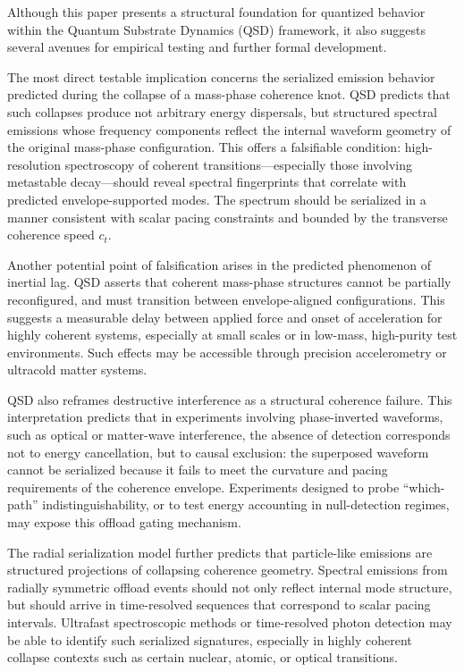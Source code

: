 \documentclass[entropy,article,submit,pdftex,moreauthors]{Definitions/mdpi}
\begin{document}
Although this paper presents a structural foundation for quantized behavior within the Quantum Substrate Dynamics (QSD) framework, it also suggests several avenues for empirical testing and further formal development.

The most direct testable implication concerns the serialized emission behavior predicted during the collapse of a mass-phase coherence knot. QSD predicts that such collapses produce not arbitrary energy dispersals, but structured spectral emissions whose frequency components reflect the internal waveform geometry of the original mass-phase configuration. This offers a falsifiable condition: high-resolution spectroscopy of coherent transitions—especially those involving metastable decay—should reveal spectral fingerprints that correlate with predicted envelope-supported modes. The spectrum should be serialized in a manner consistent with scalar pacing constraints and bounded by the transverse coherence speed \( c_t \).

Another potential point of falsification arises in the predicted phenomenon of inertial lag. QSD asserts that coherent mass-phase structures cannot be partially reconfigured, and must transition between envelope-aligned configurations. This suggests a measurable delay between applied force and onset of acceleration for highly coherent systems, especially at small scales or in low-mass, high-purity test environments. Such effects may be accessible through precision accelerometry or ultracold matter systems.

QSD also reframes destructive interference as a structural coherence failure. This interpretation predicts that in experiments involving phase-inverted waveforms, such as optical or matter-wave interference, the absence of detection corresponds not to energy cancellation, but to causal exclusion: the superposed waveform cannot be serialized because it fails to meet the curvature and pacing requirements of the coherence envelope. Experiments designed to probe “which-path” indistinguishability, or to test energy accounting in null-detection regimes, may expose this offload gating mechanism.

The radial serialization model further predicts that particle-like emissions are structured projections of collapsing coherence geometry. Spectral emissions from radially symmetric offload events should not only reflect internal mode structure, but should arrive in time-resolved sequences that correspond to scalar pacing intervals. Ultrafast spectroscopic methods or time-resolved photon detection may be able to identify such serialized signatures, especially in highly coherent collapse contexts such as certain nuclear, atomic, or optical transitions.
\end{document}
